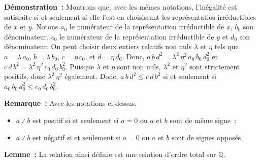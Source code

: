 \noindent\textbf{Démonstration :} 
    Montrons que, avec les mêmes notations, l'inégalité est satisfaite si et seulement si elle l'est en choisissant les représentatios irréductibles de $x$ et $y$.
    Notons $a_0$ le numérateur de la représentation irréductible de $x$, $b_0$ son dénominateur, $c_0$ le numérateur de la représentation irréductible de $y$ et $d_0$ son dénominateur.
    On peut choisir deux entiers relatifs non nuls $\lambda$ et $\eta$ tels que $a = \lambda \, a_0$, $b = \lambda \, b_0$, $c = \eta \, c_0$, et $d = \eta \, d_0$.
    Donc, $a \, b \, d^2 = \lambda^2 \, \eta^2 \, a_0 \, b_0 \, d_0^2$ et $c \, d \, b^2 = \lambda^2 \, \eta^2 \, c_0 \, d_0 \, b_0^2$.
    Puisque $\lambda$ et $\eta$ sont non nuls, $\lambda^2$ et $\eta^2$ sont strictement positifs, donc $\lambda^2 \, \eta^2$ également.
    Donc, $a \, b \, d^2 \leq c \, d \, b^2$ si et seulement si $a_0 \, b_0 \, d_0^2 \leq c_0 \, d_0 \, b_0^2$.
    
    \done

\medskip

\noindent\textbf{Remarque :} Avec les notations ci-dessus, 
\begin{itemize}[nosep]
    \item $a \divslash b$ est positif si et seulement si $a = 0$ ou $a$ et $b$ sont de même signe ;
    \item $a \divslash b$ est négatif si et seulement si $a = 0$ ou $a$ et $b$ sont de signes opposés.
\end{itemize}

\medskip

\noindent\textbf{Lemme :} La relation ainsi définie est une relation d'ordre total sur $\mathbb{Q}$.

\medskip

